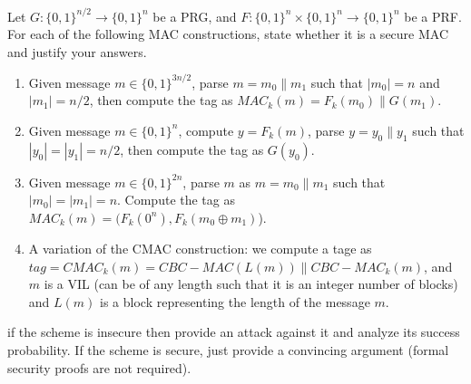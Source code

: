 \documentclass[12pt]{article}
\newcommand{\zo}{\{0,1\}}
\newcommand*\concat{\mathbin{\|}}
\begin{document}

Let $G:\zo^{n/2} \to \zo^{n}$ be a PRG, and $F:\zo^n \times \zo^n \to \zo^n$ be a PRF. For each of the following MAC constructions, state whether it is a secure MAC and justify your answers.
\begin{enumerate}
\item Given message $m \in \zo^{3n/2}$, parse $m = m_0 \concat m_1$ such that $|m_0| = n$ and $|m_1| = n/2$, then compute the tag as $MAC_k(m) = F_k(m_0) \concat G(m_1)$.

\item Given message $m \in \zo^{n}$, compute $y = F_k(m)$, parse $y = y_0 \concat y_1$ such that $|y_0| = |y_1| = n/2$, then compute the tag as $G(y_0)$.

\item Given message $m \in \zo^{2n}$, parse $m$ as $m = m_0 \concat m_1 $ such that $|m_0| = |m_1|= n$. Compute the tag as $MAC_k(m) = (F_k(0^n), F_k(m_0 \oplus m_1)$).

\item A variation of the CMAC construction: we compute a tage as $tag = CMAC_k(m) = CBC-MAC(L(m)) \concat CBC-MAC_k(m)$, and $m$ is a VIL (can be of any length such that it is an integer number of blocks) and $L(m)$ is a block representing the length of the message $m$.
\end{enumerate} 


 if the scheme is insecure then provide an attack against it and analyze its success probability. If the scheme is secure, just provide a convincing argument (formal security proofs are not required).
\\
\end{document}
